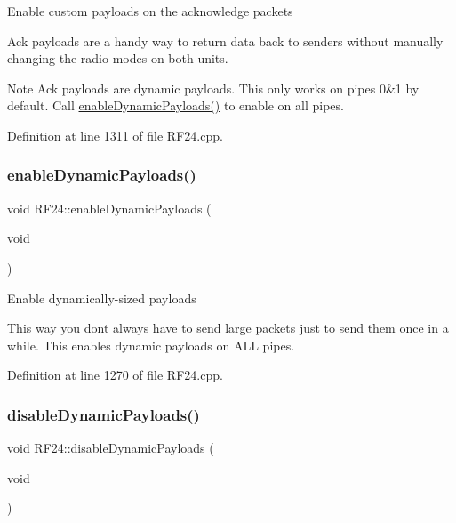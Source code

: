 Enable custom payloads on the acknowledge packets

Ack payloads are a handy way to return data back to senders without manually changing the radio modes on both units.

\begin{DoxyNote}{Note}
Ack payloads are dynamic payloads. This only works on pipes 0\&1 by default. Call \hyperlink{classRF24_a443888504975d7441d6452a09d09a8fa}{enable\+Dynamic\+Payloads()} to enable on all pipes. 
\end{DoxyNote}


Definition at line 1311 of file R\+F24.\+cpp.

\mbox{\label{classRF24_a443888504975d7441d6452a09d09a8fa}} 
\subsubsection{\texorpdfstring{enable\+Dynamic\+Payloads()}{enableDynamicPayloads()}}
{\footnotesize\ttfamily void R\+F24\+::enable\+Dynamic\+Payloads (\begin{DoxyParamCaption}\item[{void}]{ }\end{DoxyParamCaption})}

Enable dynamically-\/sized payloads

This way you don\textquotesingle{}t always have to send large packets just to send them once in a while. This enables dynamic payloads on A\+LL pipes. 

Definition at line 1270 of file R\+F24.\+cpp.

\mbox{\label{classRF24_a486c4c47a6973614ae595ae96f221165}} 
\subsubsection{\texorpdfstring{disable\+Dynamic\+Payloads()}{disableDynamicPayloads()}}
{\footnotesize\ttfamily void R\+F24\+::disable\+Dynamic\+Payloads (\begin{DoxyParamCaption}\item[{void}]{ }\end{DoxyParamCaption})}

